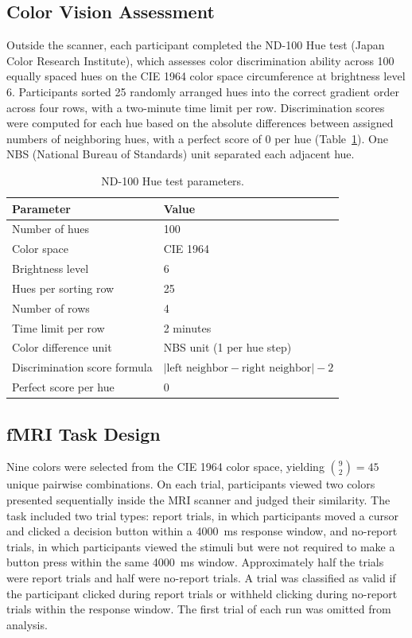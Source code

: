 \documentclass[11pt]{article}
\begin{document}
\subsection{Color Vision Assessment}

Outside the scanner, each participant completed the ND-100 Hue test (Japan Color Research Institute), which assesses color discrimination ability across 100 equally spaced hues on the CIE 1964 color space circumference at brightness level 6. Participants sorted 25 randomly arranged hues into the correct gradient order across four rows, with a two-minute time limit per row. Discrimination scores were computed for each hue based on the absolute differences between assigned numbers of neighboring hues, with a perfect score of 0 per hue (Table~\ref{tab:huetest}). One NBS (National Bureau of Standards) unit separated each adjacent hue.

\begin{table}[htbp]
\centering
\caption{ND-100 Hue test parameters.}
\label{tab:huetest}
\begin{tabular}{ll}
\toprule
Parameter & Value \\
\midrule
Number of hues & 100 \\
Color space & CIE 1964 \\
Brightness level & 6 \\
Hues per sorting row & 25 \\
Number of rows & 4 \\
Time limit per row & 2 minutes \\
Color difference unit & NBS unit (1 per hue step) \\
Discrimination score formula & $|\text{left neighbor} - \text{right neighbor}| - 2$ \\
Perfect score per hue & 0 \\
\bottomrule
\end{tabular}
\end{table}

\subsection{fMRI Task Design}

Nine colors were selected from the CIE 1964 color space, yielding $\binom{9}{2} = 45$ unique pairwise combinations. On each trial, participants viewed two colors presented sequentially inside the MRI scanner and judged their similarity. The task included two trial types: report trials, in which participants moved a cursor and clicked a decision button within a 4000~ms response window, and no-report trials, in which participants viewed the stimuli but were not required to make a button press within the same 4000~ms window. Approximately half the trials were report trials and half were no-report trials. A trial was classified as valid if the participant clicked during report trials or withheld clicking during no-report trials within the response window. The first trial of each run was omitted from analysis.
\end{document}
